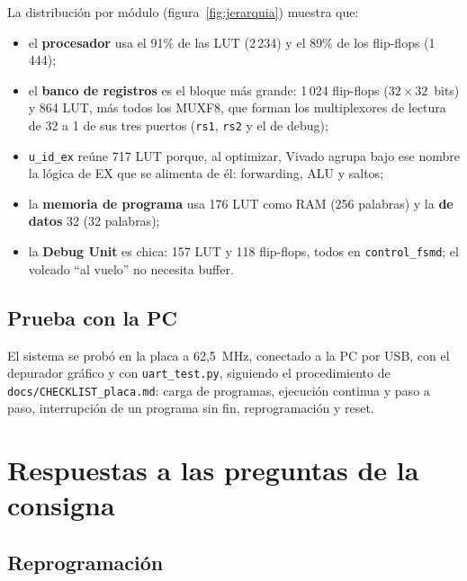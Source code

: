 \documentclass[12pt,a4paper]{article}
\begin{document}
La distribución por módulo (figura~\ref{fig:jerarquia}) muestra que:
\begin{itemize}[nosep]
  \item el \textbf{procesador} usa el 91\% de las LUT (2\,234) y el 89\% de los
        flip-flops (1\,444);
  \item el \textbf{banco de registros} es el bloque más grande: 1\,024
        flip-flops ($32 \times 32$~bits) y 864 LUT, más todos los MUXF8, que
        forman los multiplexores de lectura de 32 a 1 de sus tres puertos
        (\texttt{rs1}, \texttt{rs2} y el de debug);
  \item \texttt{u\_id\_ex} reúne 717 LUT porque, al optimizar, Vivado agrupa
        bajo ese nombre la lógica de EX que se alimenta de él: forwarding, ALU
        y saltos;
  \item la \textbf{memoria de programa} usa 176 LUT como RAM (256 palabras) y
        la \textbf{de datos} 32 (32 palabras);
  \item la \textbf{Debug Unit} es chica: 157 LUT y 118 flip-flops, todos en
        \texttt{control\_fsmd}; el volcado ``al vuelo'' no necesita buffer.
\end{itemize}

\subsection{Prueba con la PC}

El sistema se probó en la placa a 62,5~MHz, conectado a la PC por USB, con el
depurador gráfico y con \texttt{uart\_test.py}, siguiendo el procedimiento de
\texttt{docs/CHECKLIST\_placa.md}: carga de programas, ejecución continua y
paso a paso, interrupción de un programa sin fin, reprogramación y reset.

\section{Respuestas a las preguntas de la consigna}

\subsection{Reprogramación}
\end{document}
